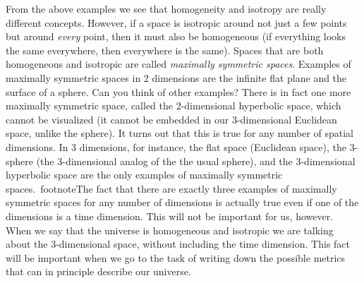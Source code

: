 From the above examples we see that homogeneity and isotropy are really different concepts. However, if a space is isotropic around not just a few points but around {\it every} point, then it must also be homogeneous (if everything looks the same everywhere, then everywhere is the same). Spaces that are both homogeneous and isotropic are called {\it maximally symmetric spaces}. Examples of maximally symmetric spaces in 2 dimensions are the infinite flat plane and the surface of a sphere. Can you think of other examples? There is in fact one more maximally symmetric space, called the 2-dimensional hyperbolic space, which cannot be visualized (it cannot be embedded in our 3-dimensional Euclidean space, unlike the sphere). It turns out that this is true for any number of spatial dimensions. In 3 dimensions, for instance, the flat space (Euclidean space), the 3-sphere (the 3-dimensional analog of the the usual sphere), and the 3-dimensional hyperbolic space are the only examples of maximally symmetric spaces.\
footnote{The fact that there are exactly three examples of maximally symmetric spaces for any number of dimensions is actually true even if one of the dimensions is a time dimension. This will not be important for us, however. When we say that the universe is homogeneous and isotropic we are talking about the 3-dimensional space, without including the time dimension.} This fact will be important when we go to the task of writing down the possible metrics that can in principle describe our universe.

